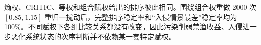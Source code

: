 熵权、CRITIC、等权和组合赋权给出的排序彼此相同。围绕组合权重做 2000 次 $[0.85,1.15]$ 重归一扰动后，完整排序稳定率和“入侵情景最差”稳定率均为 100\%。不同赋权下各组比较关系都没有改变，因此污染削弱禁渔收益、入侵进一步恶化系统状态的次序判断并不依赖某一套特定赋权。
